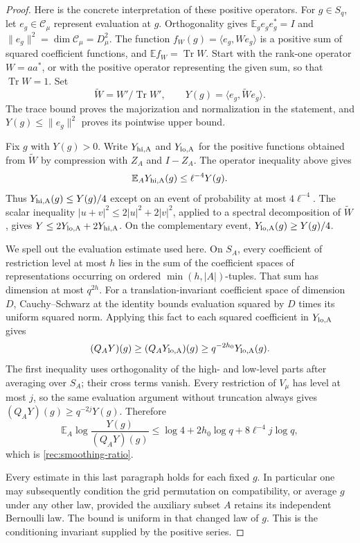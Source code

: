 \begin{proof}
Here is the concrete interpretation of these positive operators.
For $g\in S_q$, let $e_g\in\mathcal C_\mu$ represent evaluation
at $g$. Orthogonality gives
$\mathbb E_g e_ge_g^*=I$ and $\|e_g\|^2=\dim\mathcal C_\mu
=D_\mu^2$. The function $f_W(g)=\langle e_g,We_g\rangle$
is a positive sum of squared coefficient functions, and
$\mathbb E f_W=\operatorname{Tr}W$. Start with the rank-one
operator $W=aa^*$, or with the positive operator representing the
given sum, so that $\operatorname{Tr}W=1$. Set
\[
 \widetilde W=W'/\operatorname{Tr}W',\qquad
 Y(g)=\langle e_g,\widetilde W e_g\rangle.
\]
The trace bound proves the majorization and normalization in the
statement, and $Y(g)\le\|e_g\|^2$ proves its pointwise upper bound.

Fix $g$ with $Y(g)>0$. Write $Y_{\rm hi,A}$ and $Y_{\rm lo,A}$
for the positive functions obtained from $\widetilde W$ by compression
with $Z_A$ and $I-Z_A$. The operator inequality above gives
\[
 \mathbb E_A Y_{\rm hi,A}(g)\le\ell^{-4}Y(g).
\]
Thus $Y_{\rm hi,A}(g)\le Y(g)/4$ except on an event of probability
at most $4\ell^{-4}$. The scalar inequality $|u+v|^2\le
2|u|^2+2|v|^2$, applied to a spectral decomposition of
$\widetilde W$, gives $Y\le2Y_{\rm lo,A}+2Y_{\rm hi,A}$.
On the complementary event, $Y_{\rm lo,A}(g)\ge Y(g)/4$.

We spell out the evaluation estimate used here. On $S_A$, every
coefficient of restriction level at most $h$ lies in the sum of the
coefficient spaces of representations occurring on ordered
$\min(h,|A|)$-tuples. That sum has dimension at most $q^{2h}$.
For a translation-invariant coefficient space of dimension $D$,
Cauchy--Schwarz at the identity bounds evaluation squared by $D$
times its uniform squared norm. Applying this fact to each squared
coefficient in $Y_{\rm lo,A}$ gives
\[
 (Q_A Y)(g)\ge (Q_A Y_{\rm lo,A})(g)
 \ge q^{-2h_0}Y_{\rm lo,A}(g).
\]
The first inequality uses orthogonality of the high- and low-level
parts after averaging over $S_A$; their cross terms vanish. Every
restriction of $V_\mu$ has level at most $j$, so the same evaluation
argument without truncation always gives
$(Q_A Y)(g)\ge q^{-2j}Y(g)$. Therefore
\[
 \mathbb E_A\log\frac{Y(g)}{(Q_A Y)(g)}
 \le\log4+2h_0\log q+8\ell^{-4}j\log q,
\]
which is \eqref{rec:smoothing-ratio}.

Every estimate in this last paragraph holds for each fixed $g$.
In particular one may subsequently condition the grid permutation
on compatibility, or average $g$ under any other law, provided the
auxiliary subset $A$ retains its independent Bernoulli law. The
bound is uniform in that changed law of $g$. This is the
conditioning invariant supplied by the positive series.
\end{proof}

